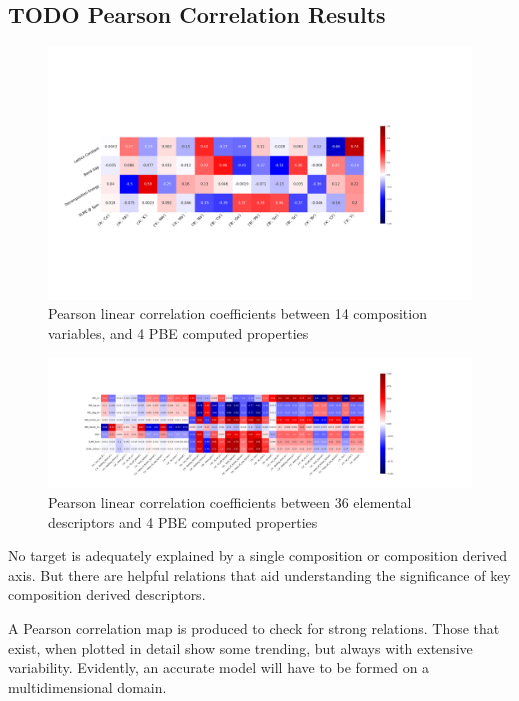 \documentclass[twoside, twocolumn, 9pt, draft]{article}
\begin{document}
\subsection*{{\bfseries\sffamily TODO} Pearson Correlation Results}
\label{sec:org29826cb}
\begin{figure}
\centering
\includegraphics[width=.9\linewidth]{PBE_v_comp_pearson2.png}
\caption{\label{fig:pearson_pcomp} Pearson linear correlation coefficients between 14 composition variables, and 4 PBE computed properties}
\end{figure}

\begin{figure}
\centering
\includegraphics[width=.9\linewidth]{PBE_v_site_prop_pearson.png}
\caption{\label{fig:pearson_psite} Pearson linear correlation coefficients between 36 elemental descriptors and 4 PBE computed properties}
\end{figure}

No target is adequately explained by a single composition or
composition derived axis. But there are helpful relations that aid
understanding the significance of key composition derived descriptors.

A Pearson correlation map is produced to check for strong
relations. Those that exist, when plotted in detail show some
trending, but always with extensive variability. Evidently, an
accurate model will have to be formed on a multidimensional domain.
\end{document}
